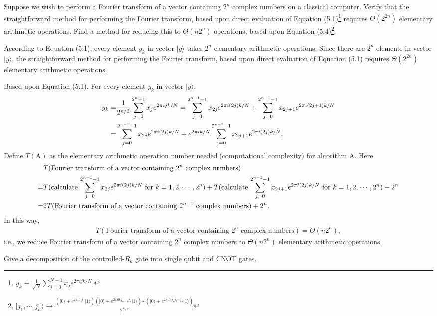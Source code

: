 \documentclass[en]{sol-man}
\begin{document}
\begin{exe}
    Suppose we wish to perform a Fourier transform of a vector containing $2^n$ complex numbers on a classical computer. Verify that the straightforward method for performing the Fourier transform, based upon direct evaluation of Equation (5.1)\footnote{\label{Equ-5.1}$y_k\equiv\frac{1}{\sqrt{N}}\sum_{j=0}^{N-1}x_je^{2\pi ijk/N}$.} requires $\Theta(2^{2n})$ elementary arithmetic operations. Find a method for reducing this to $\Theta(n2^n)$ operations, based upon Equation (5.4)\footnote{\label{Equ-5.4}$\lvert j_1,\cdots,j_n\rangle\rightarrow\frac{\left(\lvert 0\rangle+e^{2\pi i0.j_n}\lvert 1\rangle\right)\left(\lvert 0\rangle+e^{2\pi i0.j_{n-1}j_n}\lvert 1\rangle\right)\cdots\left(\lvert 0\rangle+e^{2\pi i0.j_1j_2\cdots j_n}\lvert 1\rangle\right)}{2^{n/2}}$}.
\end{exe}
\begin{sol}
    According to Equation (5.1), every element $y_k$ in vector $\lvert y\rangle$ takes $2^n$ elementary arithmetic operations. Since there are $2^n$ elements in vector $\lvert y\rangle$, the straightforward method for performing the Fourier transform, based upon direct evaluation of Equation (5.1) requires $\Theta(2^{2n})$ elementary arithmetic operations.

    Based upon Equation (5.1). For every element $y_k$ in vector $\lvert y\rangle$,
    \begin{align}
        \notag y_k=&\frac{1}{2^{n/2}}\sum_{j=0}^{2^n-1}x_je^{2\pi ijk/N}=\sum_{j=0}^{2^{n-1}-1}x_{2j}e^{2\pi i(2j)k/N}+\sum_{j=0}^{2^{n-1}-1}x_{2j+1}e^{2\pi i(2j+1)k/N}\\
        =&\sum_{j=0}^{2^{n-1}-1}x_{2j}e^{2\pi i(2j)k/N}+e^{2\pi ik/N}\sum_{j=0}^{2^{n-1}-1}x_{2j+1}e^{2\pi i(2j)k/N}.
    \end{align}
    Define $T(\text{A})$ as the elementary arithmetic operation number needed (computational complexity) for algorithm A. Here,
    \begin{align}
        \notag&T(\text{Fourier transform of a vector containing $2^n$ complex numbers})\\
        \notag=&T(\text{calculate $\sum_{j=0}^{2^{n-1}-1}x_{2j}e^{2\pi i(2j)k/N}$ for }k=1,2,\cdots,2^n)+T(\text{calculate $\sum_{j=0}^{2^{n-1}-1}x_{2j+1}e^{2\pi i(2j)k/N}$ for }k=1,2,\cdots,2^n)+2^n\\
        \notag=&2T(\text{Fourier transform of a vector containing $2^{n-1}$ complex numbers})+2^n.
    \end{align}
    In this way,
    \begin{align}
        T(\text{Fourier transform of a vector containing $2^n$ complex numbers})=O(n2^n),
    \end{align}
    i.e., we reduce Fourier transform of a vector containing $2^n$ complex numbers to $\Theta(n2^n)$ elementary arithmetic operations.
\end{sol}

\begin{exe}
    Give a decomposition of the controlled-$R_k$ gate into single qubit and CNOT gates.
\end{exe}
\begin{sol}
    
\end{sol}

\ifx\allfiles\undefined
\end{document}
